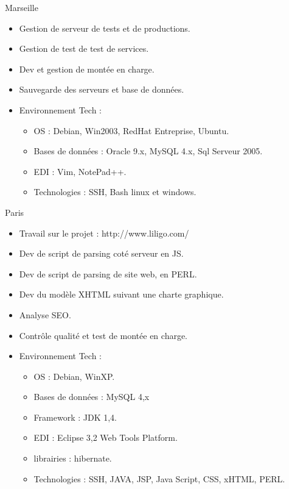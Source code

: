 \documentclass[10pt,a4paper,sans]{moderncv}
\begin{document}
{Marseille}{
  \begin{itemize}%
    \item Gestion de serveur de tests et de productions.
    \item Gestion de test de test de services.
    \item Dev et gestion de montée en charge.
    \item Sauvegarde des serveurs et base de données.
    \item Environnement Tech :
      \begin{itemize}%
        \item OS : Debian, Win2003, RedHat Entreprise, Ubuntu.
        \item Bases de données : Oracle 9.x, MySQL 4.x, Sql Serveur 2005.
        \item EDI : Vim, NotePad++.
        \item Technologies : SSH, Bash linux et windows.
      \end{itemize}
  \end{itemize}}

{Paris}{
  \begin{itemize}%
    \item Travail sur le projet : http://www.liligo.com/
    \item Dev de script de parsing coté serveur en JS.
    \item Dev de script de parsing de site web, en PERL.
    \item Dev du modèle XHTML suivant une charte graphique.
    \item Analyse SEO.
    \item Contrôle qualité et test de montée en charge.
    \item Environnement Tech :
      \begin{itemize}%
        \item OS : Debian, WinXP.
        \item Bases de données : MySQL 4,x
        \item Framework : JDK 1,4.
        \item EDI : Eclipse 3,2 Web Tools Platform.
        \item librairies : hibernate.
        \item Technologies : SSH, JAVA, JSP, Java Script, CSS, xHTML, PERL.
      \end{itemize}
  \end{itemize}}
\end{document}
